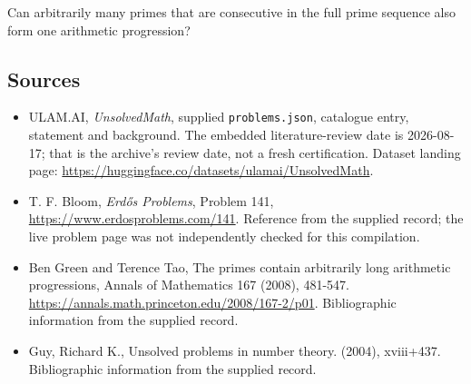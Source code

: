 \documentclass[11pt,a4paper]{article}
\begin{document}
Can arbitrarily many primes that are consecutive in the full prime sequence also form one arithmetic progression?

\subsection{Sources}

{\small

\begin{itemize}

\item[\hypertarget{source:statement:1}{S1}] ULAM.AI, \emph{UnsolvedMath}, supplied \texttt{problems.json}, catalogue entry, statement and background. The embedded literature-review date is 2026-08-17; that is the archive’s review date, not a fresh certification. Dataset landing page: \url{https://huggingface.co/datasets/ulamai/UnsolvedMath}.

\item[\hypertarget{source:statement:2}{S2}] T. F. Bloom, \emph{Erdős Problems}, Problem 141, \url{https://www.erdosproblems.com/141}. Reference from the supplied record; the live problem page was not independently checked for this compilation.

\item[\hypertarget{source:statement:3}{S3}] Ben Green and Terence Tao, The primes contain arbitrarily long arithmetic progressions, Annals of Mathematics 167 (2008), 481-547. \url{https://annals.math.princeton.edu/2008/167-2/p01}. Bibliographic information from the supplied record.

\item[\hypertarget{source:statement:4}{S4}] Guy, Richard K., Unsolved problems in number theory. (2004), xviii+437. Bibliographic information from the supplied record.

\end{itemize}

}

\label{end:statement}
\end{document}
